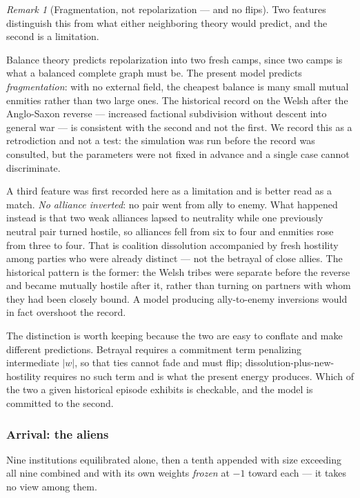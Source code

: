 \documentclass[11pt]{article}
\numberwithin{equation}{section}
\theoremstyle{plain}
\theoremstyle{definition}
\theoremstyle{remark}
\newtheorem{remark}[theorem]{Remark}
\begin{document}
\begin{remark}[Fragmentation, not repolarization --- and no flips]
\label{ad:rem:welshreading}
Two features distinguish this from what either neighboring theory would
predict, and the second is a limitation.

Balance theory predicts repolarization into two fresh camps, since two
camps is what a balanced complete graph must be. The present model
predicts \emph{fragmentation}: with no external field, the cheapest
balance is many small mutual enmities rather than two large ones. The
historical record on the Welsh after the Anglo-Saxon reverse ---
increased factional subdivision without descent into general war --- is
consistent with the second and not the first. We record this as a
retrodiction and not a test: the simulation was run before the record
was consulted, but the parameters were not fixed in advance and a single
case cannot discriminate.

A third feature was first recorded here as a limitation and is better
read as a match. \emph{No alliance inverted}: no pair went from ally to
enemy. What happened instead is that two weak alliances lapsed to
neutrality while one previously neutral pair turned hostile, so
alliances fell from six to four and enmities rose from three to four.
That is coalition dissolution accompanied by fresh hostility among
parties who were already distinct --- not the betrayal of close allies.
The historical pattern is the former: the Welsh tribes were separate
before the reverse and became mutually hostile after it, rather than
turning on partners with whom they had been closely bound. A model
producing ally-to-enemy inversions would in fact overshoot the record.

The distinction is worth keeping because the two are easy to conflate
and make different predictions. Betrayal requires a commitment term
penalizing intermediate $|w|$, so that ties cannot fade and must flip;
dissolution-plus-new-hostility requires no such term and is what the
present energy produces. Which of the two a given historical episode
exhibits is checkable, and the model is committed to the second.
\end{remark}

\subsubsection{Arrival: the aliens}\label{ad:subsub:aliens}

Nine institutions equilibrated alone, then a tenth appended with size
exceeding all nine combined and with its own weights \emph{frozen} at
$-1$ toward each --- it takes no view among them.
\end{document}
